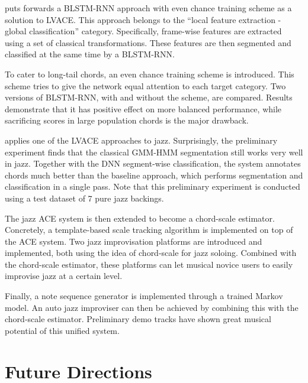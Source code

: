  puts forwards a BLSTM-RNN approach with even chance training scheme as a solution to LVACE. This approach belongs to the ``local feature extraction - global classification'' category. Specifically, frame-wise features are extracted using a set of classical transformations. These features are then segmented and classified at the same time by a BLSTM-RNN.

To cater to long-tail chords, an even chance training scheme is introduced. This scheme tries to give the network equal attention to each target category. Two versions of BLSTM-RNN, with and without the scheme, are compared. Results demonstrate that it has positive effect on more balanced performance, while sacrificing scores in large population chords is the major drawback.

 applies one of the LVACE approaches to jazz. Surprisingly, the preliminary experiment finds that the classical GMM-HMM segmentation still works very well in jazz. Together with the DNN segment-wise classification, the system annotates chords much better than the baseline approach, which performs segmentation and classification in a single pass. Note that this preliminary experiment is conducted using a test dataset of 7 pure jazz backings.

The jazz ACE system is then extended to become a chord-scale estimator. Concretely, a template-based scale tracking algorithm is implemented on top of the ACE system. Two jazz improvisation platforms are introduced and implemented, both using the idea of chord-scale for jazz soloing. Combined with the chord-scale estimator, these platforms can let musical novice users to easily improvise jazz at a certain level.

Finally, a note sequence generator is implemented through a trained Markov model. An auto jazz improviser can then be achieved by combining this with the chord-scale estimator. Preliminary demo tracks have shown great musical potential of this unified system.

\section{Future Directions} \label{sec:6-future}


